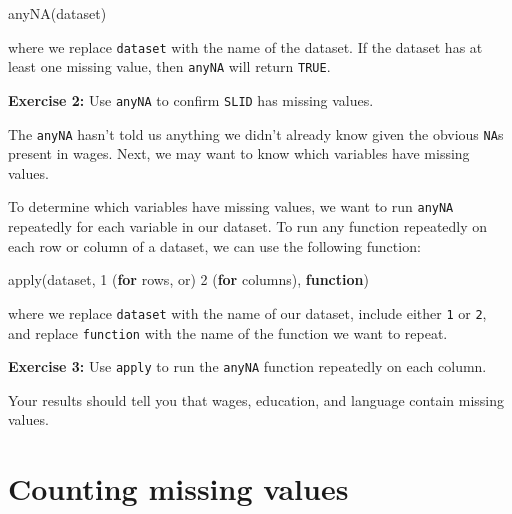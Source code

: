 \documentclass[
]{book}
\makeatletter
\newenvironment{Shaded}{\begin{snugshade}}{\end{snugshade}}
\newcommand{\ControlFlowTok}[1]{\textcolor[rgb]{0.27,0.27,0.27}{\textbf{#1}}}
\newcommand{\DecValTok}[1]{\textcolor[rgb]{0.06,0.06,0.06}{#1}}
\newcommand{\FunctionTok}[1]{\textcolor[rgb]{0,0,0}{#1}}
\newcommand{\NormalTok}[1]{#1}
\newenvironment{kframe}{%
\medskip{}
\setlength{\fboxsep}{.8em}
 \def\at@end@of@kframe{}%
 \ifinner\ifhmode%
  \def\at@end@of@kframe{\end{minipage}}%
  \begin{minipage}{\columnwidth}%
 \fi\fi%
 \def\FrameCommand##1{\hskip\@totalleftmargin \hskip-\fboxsep
 \colorbox{shadecolor}{##1}\hskip-\fboxsep
     \hskip-\linewidth \hskip-\@totalleftmargin \hskip\columnwidth}%
 \MakeFramed {\advance\hsize-\width
   \@totalleftmargin\z@ \linewidth\hsize
   \@setminipage}}%
 {\par\unskip\endMakeFramed%
 \at@end@of@kframe}
\renewenvironment{Shaded}{\begin{kframe}}{\end{kframe}}
\newenvironment{rmdblock}[1]
  {\begin{shaded*}
  }
  {\end{shaded*}
  }
\newenvironment{learncheck}
  {\begin{rmdblock}{warning}}
  {\end{rmdblock}}
\makeatother
\begin{document}
\begin{Shaded}
\begin{Highlighting}[]
\FunctionTok{anyNA}\NormalTok{(dataset)}
\end{Highlighting}
\end{Shaded}

where we replace \texttt{dataset} with the name of the dataset. If the dataset has at least one missing value, then \texttt{anyNA} will return \texttt{TRUE}.

\begin{learncheck}
\textbf{Exercise 2:} Use \texttt{anyNA} to confirm \texttt{SLID} has
missing values.
\end{learncheck}

The \texttt{anyNA} hasn't told us anything we didn't already know given the obvious \texttt{NA}s present in wages. Next, we may want to know which variables have missing values.

To determine which variables have missing values, we want to run \texttt{anyNA} repeatedly for each variable in our dataset. To run any function repeatedly on each row or column of a dataset, we can use the following function:

\begin{Shaded}
\begin{Highlighting}[]
\FunctionTok{apply}\NormalTok{(dataset, }\DecValTok{1}\NormalTok{ (}\ControlFlowTok{for}\NormalTok{ rows, or) }\DecValTok{2}\NormalTok{ (}\ControlFlowTok{for}\NormalTok{ columns), }\ControlFlowTok{function}\NormalTok{)}
\end{Highlighting}
\end{Shaded}

where we replace \texttt{dataset} with the name of our dataset, include either \texttt{1} or \texttt{2}, and replace \texttt{function} with the name of the function we want to repeat.

\begin{learncheck}
\textbf{Exercise 3:} Use \texttt{apply} to run the \texttt{anyNA}
function repeatedly on each column.
\end{learncheck}

Your results should tell you that wages, education, and language contain missing values.

\hypertarget{counting-missing-values}{%
\section{Counting missing values}\label{counting-missing-values}}
\end{document}

